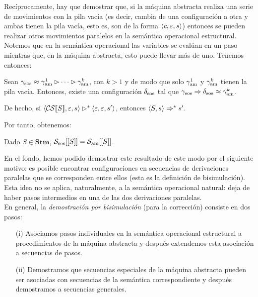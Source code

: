 Recíprocamente, hay que demostrar que, si la máquina abstracta realiza una serie de movimientos con la pila vacía (es decir, cambia de una configuración a otra y ambas tienen la pila vacía, esto es, son de la forma $\langle c, \varepsilon, s \rangle$) entonces se pueden realizar otros movimientos paralelos en la semántica operacional estructural. Notemos que en la semántica operacional las variables se evalúan en un paso mientras que, en la máquina abstracta, esto puede llevar más de uno. Tenemos entonces:
\begin{lema}
Sean $\gamma_{\mathrm{sos}}\approx \gamma_{\mathrm{am}}^1 \rhd \dots \rhd \gamma_{\mathrm{am}}^k$, con $k>1$ y de modo que solo $\gamma_{\mathrm{am}}^1$ y $\gamma_{\mathrm{am}}^k$ tienen la pila vacía. Entonces, existe una configuración $\delta_{\mathrm{sos}}$ tal que $\gamma_{\mathrm{sos}}\Rightarrow \delta_{\mathrm{sos}}\approx \gamma_{\mathrm{am}}^k$. 

De hecho, si $\langle \mathcal{CS}[\![S]\!], \varepsilon, s \rangle\rhd^* \langle \varepsilon, \varepsilon, s' \rangle$, entonces $\langle S, s \rangle\Rightarrow^* s'$.
\end{lema}

Por tanto, obtenemos:
\begin{theorem}
Dado $S \in \mathbf{Stm}$, $\mathcal{S}_{\mathrm{sos}}[[S]]= \mathcal{S}_{\mathrm{am}}[[S]]$.
\end{theorem}

En el fondo, hemos podido demostrar este resultado de este modo por el siguiente motivo: es posible encontrar configuraciones en secuencias de derivaciones paralelas que se corresponden entre ellos (esta es la definición de bisimulación). Esta idea no se aplica, naturalmente, a la semántica operacional natural: deja de haber pasos intermedios en una de las dos derivaciones paralelas. 
\\

En general, la \textit{demostración por bisimulación} (para la corrección) consiste en dos pasos: 
\begin{itemize}
     \item[(i)] Asociamos pasos individuales en la semántica operacional estructural a procedimientos de la máquina abstracta y después extendemos esta asociación a secuencias de pasos.
     \item[(ii)] Demostramos que secuencias especiales de la máquina abstracta pueden ser asociadas con secuencias de la semántica correspondiente y después demostramos a secuencias generales.
\end{itemize}


